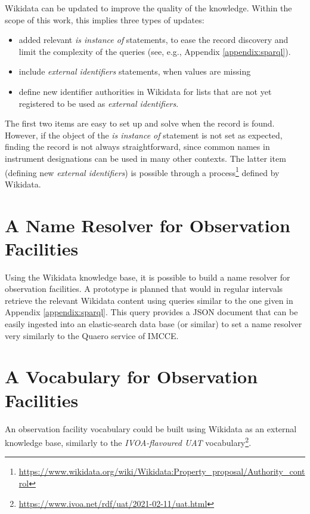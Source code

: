 \documentclass[11pt,a4paper]{ivoa}
\begin{document}
Wikidata can be updated to improve the quality of the knowledge.
Within the scope of this work, this implies three types of updates:
\begin{itemize}
\item added relevant \emph{is instance of} statements, to ease the 
record discovery and limit the complexity of the queries (see, e.g., 
Appendix \ref{appendix:sparql}). 
\item include \emph{external identifiers} statements, when values 
are missing
\item define new identifier authorities in Wikidata for lists that 
are not yet registered to be used as \emph{external identifiers}. 
\end{itemize}
The first two items are easy to set up and solve when the record is 
found. However, if the object of the \emph{is instance of} statement is 
not set as expected, finding the record is not always 
straightforward, since common names in instrument designations 
can be used in many other contexts. 
The latter item (defining new \emph{external identifiers}) is 
possible through a process\footnote{\url{https://www.wikidata.org/wiki/Wikidata:Property_proposal/Authority_control}}
defined by Wikidata. 

\section{A Name Resolver for Observation Facilities}
Using the Wikidata knowledge base, it is possible to build a name
resolver for observation facilities. A prototype is planned that would
in regular intervals retrieve the relevant 
Wikidata content using queries similar to the one
given in Appendix \ref{appendix:sparql}. This query provides
a JSON document that can be easily ingested into an elastic-search
data base (or similar) to set a name resolver very similarly to 
the Quaero service of IMCCE. 

\section{A Vocabulary for Observation Facilities}
An observation facility vocabulary could be built using Wikidata
as an external knowledge base, similarly to the \emph{IVOA-flavoured 
UAT} vocabulary\footnote{\url{https://www.ivoa.net/rdf/uat/2021-02-11/uat.html}}.
\end{document}
